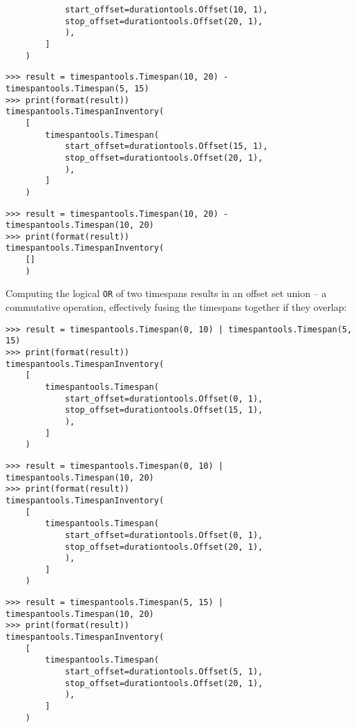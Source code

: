 \begin{singlespacing}
\begin{lstlisting}
            start_offset=durationtools.Offset(10, 1),
            stop_offset=durationtools.Offset(20, 1),
            ),
        ]
    )
\end{lstlisting}
\begin{lstlisting}
>>> result = timespantools.Timespan(10, 20) - timespantools.Timespan(5, 15)
>>> print(format(result))
timespantools.TimespanInventory(
    [
        timespantools.Timespan(
            start_offset=durationtools.Offset(15, 1),
            stop_offset=durationtools.Offset(20, 1),
            ),
        ]
    )
\end{lstlisting}
\begin{lstlisting}
>>> result = timespantools.Timespan(10, 20) - timespantools.Timespan(10, 20)
>>> print(format(result))
timespantools.TimespanInventory(
    []
    )
\end{lstlisting}
\end{singlespacing}

\noindent Computing the logical \texttt{OR} of two timespans results in an
offset set union -- a commutative operation, effectively fusing the timespans
together if they overlap:

\begin{comment}
<abjad>
result = timespantools.Timespan(0, 10) | timespantools.Timespan(5, 15)
print(format(result))
result = timespantools.Timespan(0, 10) | timespantools.Timespan(10, 20)
print(format(result))
result = timespantools.Timespan(5, 15) | timespantools.Timespan(10, 20)
print(format(result))
</abjad>
\end{comment}

\begin{singlespacing}
\vspace{-0.5\baselineskip}
\begin{lstlisting}
>>> result = timespantools.Timespan(0, 10) | timespantools.Timespan(5, 15)
>>> print(format(result))
timespantools.TimespanInventory(
    [
        timespantools.Timespan(
            start_offset=durationtools.Offset(0, 1),
            stop_offset=durationtools.Offset(15, 1),
            ),
        ]
    )
\end{lstlisting}
\begin{lstlisting}
>>> result = timespantools.Timespan(0, 10) | timespantools.Timespan(10, 20)
>>> print(format(result))
timespantools.TimespanInventory(
    [
        timespantools.Timespan(
            start_offset=durationtools.Offset(0, 1),
            stop_offset=durationtools.Offset(20, 1),
            ),
        ]
    )
\end{lstlisting}
\begin{lstlisting}
>>> result = timespantools.Timespan(5, 15) | timespantools.Timespan(10, 20)
>>> print(format(result))
timespantools.TimespanInventory(
    [
        timespantools.Timespan(
            start_offset=durationtools.Offset(5, 1),
            stop_offset=durationtools.Offset(20, 1),
            ),
        ]
    )
\end{lstlisting}
\end{singlespacing}

